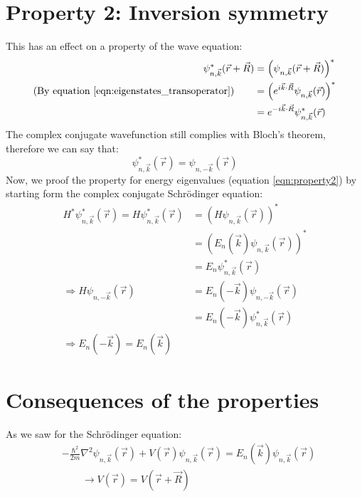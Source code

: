 \begin{RECAP}
\section{Property 2: Inversion symmetry} \label{sec:property2}
This has an effect on a property of the wave equation:
\begin{align}
	\psi_{n, \vec{k}}^{*}(\vec{r} + \vec{R}) &= \left(\psi_{n, \vec{k}}(\vec{r} + \vec{R})\right)^{*} \\
	\text{(By equation \ref{eqn:eigenstates_transoperator})}\qquad &= \left(e^{i\vec{k}\cdot\vec{R}}\psi_{n, \vec{k}}(\vec{r})\right)^{*} \\
	&= e^{-i\vec{k}\cdot\vec{R}}\psi_{n, \vec{k}}^{*}(\vec{r})
\end{align}
The complex conjugate wavefunction still complies with Bloch's theorem, therefore we can say that:
\begin{equation}
	\psi_{n, \vec{k}}^{*}(\vec{r}) = \psi_{n, -\vec{k}}(\vec{r})
\end{equation}
Now, we proof the property for energy eigenvalues (equation \ref{eqn:property2}) by starting form the complex conjugate Schrödinger equation:
\begin{align}
	H^{*}\psi_{n, \vec{k}}^{*}(\vec{r}) = H\psi_{n, \vec{k}}^{*}(\vec{r}) &= \left(H\psi_{n, \vec{k}}(\vec{r})\right)^{*} \\
	&= \left(E_n(\vec{k})\psi_{n, \vec{k}}(\vec{r})\right)^{*} \\
	&= E_n\psi_{n, \vec{k}}^{*}(\vec{r}) \\
	\Rightarrow H\psi_{n, -\vec{k}}(\vec{r}) &= E_n(-\vec{k})\psi_{n, -\vec{k}}(\vec{r}) \\
	&= E_n(-\vec{k})\psi_{n, \vec{k}}^{*}(\vec{r}) \\
	\Rightarrow E_n(-\vec{k}) = E_n(\vec{k}) \nonumber
\end{align}

\section{Consequences of the properties}
As we saw for the Schrödinger equation:
\begin{align}
    &-\frac{\hbar^2}{2m}\nabla^2\psi_{n, \vec{k}}(\vec{r}) + V(\vec{r})\psi_{n, \vec{k}}(\vec{r}) = E_n(\vec{k})\psi_{n, \vec{k}}(\vec{r}) \\
    & \qquad \rightarrow V(\vec{r}) = V(\vec{r} + \vec{R})
\end{align}


\end{RECAP}
